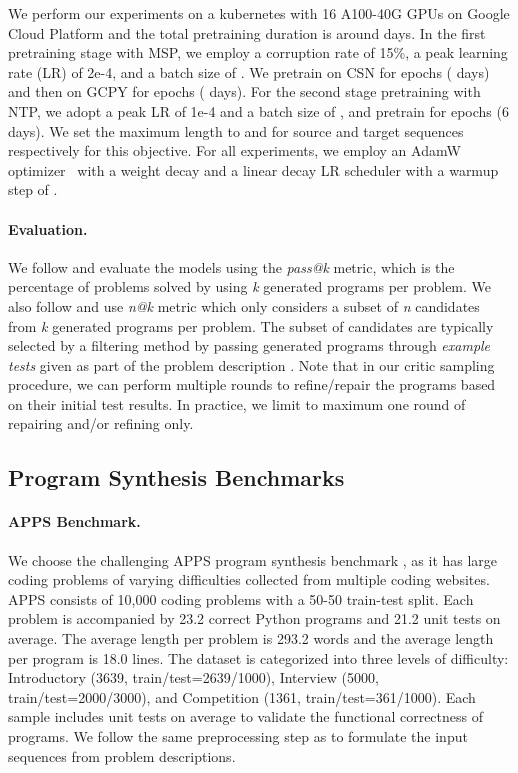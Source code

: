 \documentclass{article}
\begin{document}
We perform our experiments on a kubernetes with 16 A100-40G GPUs on Google Cloud Platform and the total pretraining duration is around  days.
In the first pretraining stage with MSP, we employ a corruption rate of 15\%, a peak learning rate (LR) of 2e-4, and a batch size of . We pretrain on CSN for  epochs ( days) and then on GCPY for  epochs ( days). 
For the second stage pretraining with NTP, we adopt a peak LR of 1e-4 and a batch size of , and pretrain for  epochs (6 days). We set the maximum length to  and  for source and target sequences respectively for this objective.
For all  experiments, we employ an AdamW optimizer~\citep{DBLP:conf/iclr/LoshchilovH19} with a  weight decay and a linear decay LR scheduler with a warmup step of . 

\paragraph{Evaluation.} 
We follow \citep{hendrycksapps2021, chen2021evaluating} and evaluate the models using the \emph{pass@k} metric, which is the percentage of problems solved by using \emph{k} generated programs per problem.  
We also follow \citep{li2022competition} and use \emph{n@k} metric which only considers a subset of \emph{n} candidates from \emph{k} generated programs per problem. 
The subset of  candidates are typically selected by a filtering method by passing generated programs through \emph{example tests} given as part of the problem description \citep{chen2021evaluating, li2022competition}. 
Note that in our critic sampling procedure, we can perform multiple rounds to refine/repair the programs based on their initial test results. 
In practice, we limit to maximum one round of repairing and/or refining only. 





\subsection{Program Synthesis Benchmarks}

\paragraph{APPS Benchmark.}
We choose the challenging APPS program synthesis benchmark \citep{hendrycksapps2021}, as it has large coding problems of varying difficulties collected from multiple coding websites. 
APPS consists of 10,000 coding problems with a 50-50 train-test split. Each problem is accompanied by 23.2 correct Python programs and 21.2 unit tests on average. The average length per problem is 293.2 words and the average length per program is 18.0 lines. The dataset is categorized into three levels of difficulty: Introductory (3639, train/test=2639/1000), Interview (5000, train/test=2000/3000), and Competition (1361, train/test=361/1000). 
Each sample includes  unit tests on average to validate the functional correctness of programs. 
We follow the same preprocessing step as \citep{hendrycksapps2021} to formulate the input sequences from problem descriptions.
\end{document}
